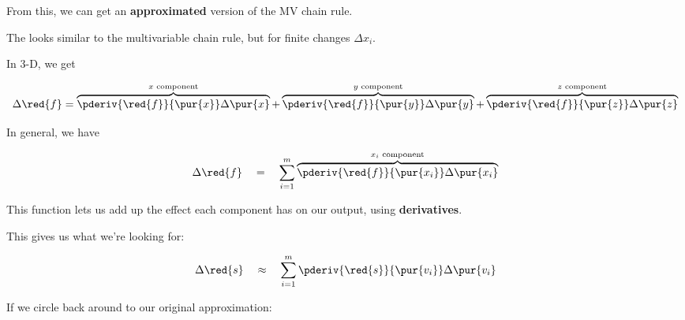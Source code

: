         From this, we can get an \textbf{approximated} version of the MV chain rule.\\
        
        \begin{definition}
            The   looks similar to the multivariable chain rule, but for finite changes $\Delta x_i$.
            
            In 3-D, we get
            
            \begin{equation*}
                \Delta \red{f} 
                = 
                \overbrace{
                    \pderiv{\red{f}}{\pur{x}}
                    \Delta \pur{x}
                }^{\text{$x$ component}}
                +
                \overbrace{
                    \pderiv{\red{f}}{\pur{y}}
                    \Delta \pur{y}
                }^{\text{$y$ component}}
                +
                \overbrace{
                    \pderiv{\red{f}}{\pur{z}}
                    \Delta \pur{z}
                }^{\text{$z$ component}}
            \end{equation*}
            
            In general, we have
            
            \begin{equation*}
                \Delta \red{f} 
                \quad
                = 
                \quad
                \sum_{i=1}^{m}
                \overbrace{
                    \pderiv{\red{f}}   {\pur{x_i}}
                    \Delta \pur{x_i}
                }^{\text{$x_i$ component}}
            \end{equation*}
        \end{definition}
        
        This function lets us add up the effect each component has on our output, using \textbf{derivatives}.
        
        This gives us what we're looking for:
        
        \begin{equation}
            \Delta \red{s} 
            \quad
            \approx
            \quad
            \sum_{i=1}^{m}
            \pderiv{\red{s}}   {\pur{v_i}}
            \Delta \pur{v_i}
        \end{equation}
        
        If we circle back around to our original approximation:
        
